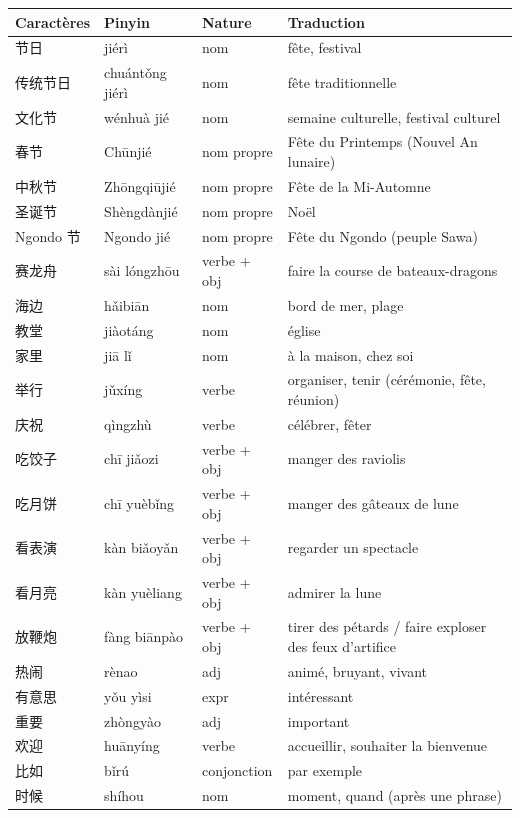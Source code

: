 \documentclass[11pt]{article}
\begin{document}
\begin{center}
\begin{tabularx}{\linewidth}{|X|X|X|X|}
\hline
\rowcolor{popblueL} Caractères & Pinyin & Nature & Traduction \\
\hline
节日 & jiérì & nom & fête, festival \\
\hline
传统节日 & chuántǒng jiérì & nom & fête traditionnelle \\
\hline
文化节 & wénhuà jié & nom & semaine culturelle, festival culturel \\
\hline
春节 & Chūnjié & nom propre & Fête du Printemps (Nouvel An lunaire) \\
\hline
中秋节 & Zhōngqiūjié & nom propre & Fête de la Mi-Automne \\
\hline
圣诞节 & Shèngdànjié & nom propre & Noël \\
\hline
Ngondo 节 & Ngondo jié & nom propre & Fête du Ngondo (peuple Sawa) \\
\hline
赛龙舟 & sài lóngzhōu & verbe + obj & faire la course de bateaux-dragons \\
\hline
海边 & hǎibiān & nom & bord de mer, plage \\
\hline
教堂 & jiàotáng & nom & église \\
\hline
家里 & jiā lǐ & nom & à la maison, chez soi \\
\hline
举行 & jǔxíng & verbe & organiser, tenir (cérémonie, fête, réunion) \\
\hline
庆祝 & qìngzhù & verbe & célébrer, fêter \\
\hline
吃饺子 & chī jiǎozi & verbe + obj & manger des raviolis \\
\hline
吃月饼 & chī yuèbǐng & verbe + obj & manger des gâteaux de lune \\
\hline
看表演 & kàn biǎoyǎn & verbe + obj & regarder un spectacle \\
\hline
看月亮 & kàn yuèliang & verbe + obj & admirer la lune \\
\hline
放鞭炮 & fàng biānpào & verbe + obj & tirer des pétards / faire exploser des feux d'artifice \\
\hline
热闹 & rènao & adj & animé, bruyant, vivant \\
\hline
有意思 & yǒu yìsi & expr & intéressant \\
\hline
重要 & zhòngyào & adj & important \\
\hline
欢迎 & huānyíng & verbe & accueillir, souhaiter la bienvenue \\
\hline
比如 & bǐrú & conjonction & par exemple \\
\hline
时候 & shíhou & nom & moment, quand (après une phrase) \\
\hline
\end{tabularx}
\end{center}
\end{document}
